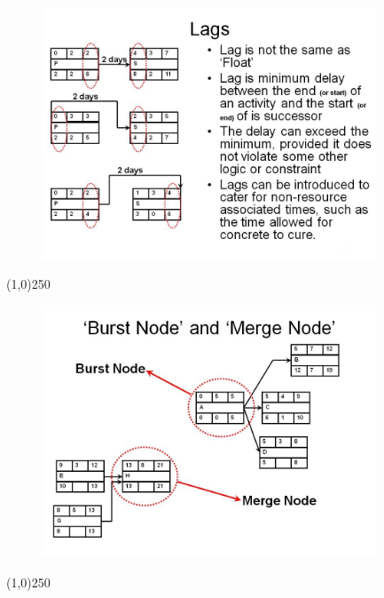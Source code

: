 \begin{frame}
\begin{figure}
	\centering
		\includegraphics[width = 10.0cm]{oldnotes/Slide180.jpg}
\end{figure}
\end{frame}
\begin{center}\line(1,0){250}\end{center}




\begin{frame}
\begin{figure}
	\centering
		\includegraphics[width = 10.0cm]{oldnotes/Slide181.jpg}
\end{figure}
\end{frame}
\begin{center}\line(1,0){250}\end{center}




